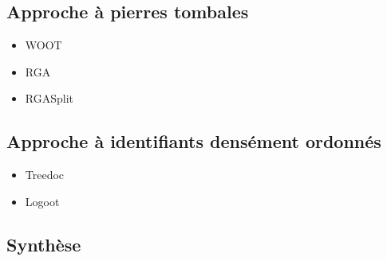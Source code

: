 \documentclass[12pt]{thesul}
\begin{document}
\subsection{Approche à pierres tombales}

\begin{itemize}
  \item WOOT \cite{oster:inria-00108523, Weiss_2007, ahmednacer:inria-00629503}
  \item RGA \cite{ROH2011354}
  \item RGASplit \cite{briot:hal-01343941}
\end{itemize}

\subsection{Approche à identifiants densément ordonnés}

\begin{itemize}
  \item Treedoc \cite{5158449}
  \item Logoot \cite{WeissICDCS09, weiss:hal-00450416}
\end{itemize}



\subsection{Synthèse}
\end{document}
